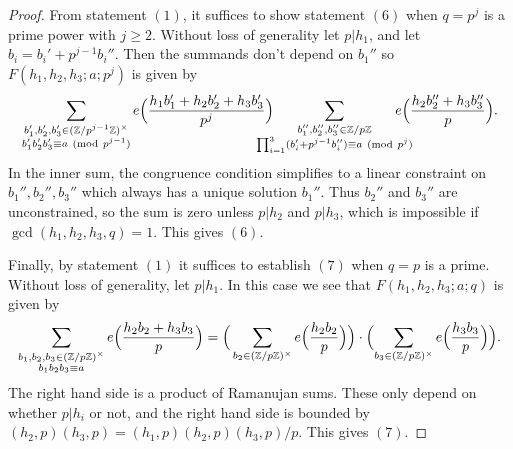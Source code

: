\documentclass[10pt]{amsart}
\theoremstyle{plain}
\numberwithin{equation}{section}
\newcommand{\Mod}[1]{\ (\mathrm{mod}\ #1)}
\begin{document}
\begin{proof}
From statement $(1)$, it suffices to show statement $(6)$ when $q=p^j$ is a prime power with $j\ge 2$. Without loss of generality let $p|h_1$, and let $b_i=b_i'+p^{j-1}b_i''$. Then the summands don't depend on $b_1''$ so $F(h_1,h_2,h_3;a;p^j)$ is given by
\[
\sum_{\substack{b_1',b_2',b_3'\in(\mathbb{Z}/p^{j-1}\mathbb{Z})^\times\\ b_1'b_2'b_3'\equiv a\Mod{p^{j-1}}}}e\Bigl(\frac{h_1b_1'+h_2b_2'+h_3b_3'}{p^j}\Bigr)\hspace{-0.5cm}\sum_{\substack{b_1'',b_2'',b_3''\in\mathbb{Z}/p\mathbb{Z}\\ \prod_{i=1}^3 (b_i'+p^{j-1}b_i'')\equiv a\Mod{p^{j}}}}\hspace{-0.5cm}e\Bigl(\frac{h_2b_2''+h_3b_3''}{p}\Bigr).
\]
In the inner sum, the congruence condition simplifies to a linear constraint on $b_1'',b_2'',b_3''$ which always has a unique solution $b_1''$. Thus $b_2''$ and $b_3''$ are unconstrained, so the sum is zero unless $p|h_2 $ and $p|h_3$, which is impossible if $\gcd(h_1,h_2,h_3,q)=1$. This gives $(6)$.

Finally, by statement $(1)$ it suffices to establish $(7)$ when $q=p$ is a prime. Without loss of generality, let $p|h_1$. In this case we see that $F(h_1,h_2,h_3;a;q)$ is given by
\[
\sum_{\substack{b_1,b_2,b_3\in(\mathbb{Z}/p\mathbb{Z})^\times\\ b_1b_2b_3\equiv a}}e\Bigl(\frac{h_2b_2+h_3b_3}{p}\Bigr)=\Big(\sum_{b_2\in(\mathbb{Z}/p\mathbb{Z})^\times}e\Bigl(\frac{h_2b_2}{p}\Bigr)\Bigr)\cdot \Bigl(\sum_{b_3\in(\mathbb{Z}/p\mathbb{Z})^\times}e\Bigl(\frac{h_3 b_3}{p}\Bigr)\Bigr).
\]
The right hand side is a product of Ramanujan sums. These only depend on whether $p|h_i$ or not, and the right hand side is bounded by $(h_2,p)(h_3,p)=(h_1,p)(h_2,p)(h_3,p)/p$. This gives $(7)$.
\end{proof}
%
%
%
%
%
%
%
%
\end{document}
